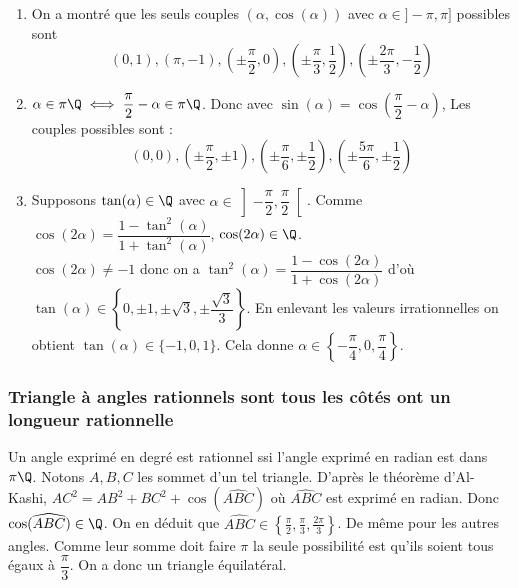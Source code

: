 \documentclass{book}
\begin{document}
\begin{enumerate}[leftmargin=*]
		Supposons que $q$ s'écrive $q=2m$ avec $m$ impair. Alors $2\alpha=\dfrac{p}{m}$ satisfait les hypothèse du cas de la question 2. Donc avec $\cos(2\alpha)=\cos(\alpha)^2-1$ on en déduit que les valeurs possibles pour $\cos(\alpha)$ sont $-1,1,0,\pm\dfrac{1}{2}$ et $\pm\dfrac{\sqrt{3}}{2}$. La seule compatible avec la forme de $\alpha$ est $0$ ce qui impose $q=2$, ici exclus.
		\item On a montré que les seuls couples $(\alpha,\cos(\alpha))$ avec $\alpha\in ]-\pi,\pi]$ possibles sont $$(0,1),(\pi,-1),\left(\pm\frac{\pi}{2},0\right),\left(\pm\frac{\pi}{3},\frac{1}{2}\right),\left(\pm\frac{2\pi}{3},-\frac{1}{2}\right)$$
		\item $\alpha\in \pi\Q\iff \dfrac{\pi}{2}-\alpha\in\pi\Q$. Donc avec $\sin(\alpha)=\cos\left(\dfrac{\pi}{2}-\alpha\right)$, Les couples possibles sont :
		$$(0,0),\left(\pm\frac{\pi}{2},\pm1\right),\left(\pm\frac{\pi}{6},\pm\frac{1}{2}\right),\left(\pm\frac{5\pi}{6},\pm\frac{1}{2}\right)$$
		\item Supposons $\tan(\alpha)\in \Q$ avec $\alpha\in \left]-\dfrac{\pi}{2},\dfrac{\pi}{2}\right[$. Comme $\cos(2\alpha)=\dfrac{1-\tan^2(\alpha)}{1+\tan^2(\alpha)}$, $\cos(2\alpha)\in \Q$.\\
		$\cos(2\alpha)\ne -1$ donc on a $\tan^2(\alpha)=\dfrac{1-\cos(2\alpha)}{1+\cos(2\alpha)}$ d'où $\tan(\alpha)\in \left\{0,\pm1,\pm\sqrt 3,\pm\dfrac{\sqrt 3}{3}\right\}$. En enlevant les valeurs irrationnelles on obtient $\tan(\alpha)\in\{-1,0,1\}$. Cela donne $\alpha\in \left\{-\dfrac{\pi}{4},0,\dfrac{\pi}{4}\right\}$.
	\end{enumerate}
	
	\subsubsection{Triangle à angles rationnels sont tous les côtés ont un longueur rationnelle }
	Un angle exprimé en degré est rationnel ssi l'angle exprimé en radian est dans $\pi\Q$. Notons $A,B,C$ les sommet d'un tel triangle. D'après le théorème d'Al-Kashi, $AC^2=AB^2+BC^2+\cos(\widehat{ABC})$ où $\widehat{ABC}$ est exprimé en radian. Donc $\cos(\widehat{ABC})\in \Q$. On en déduit que $\widehat{ABC}\in \displaystyle\left\{\frac{\pi}{2},\frac{\pi}{3},\frac{2\pi}{3}\right\}$. De même pour les autres angles. Comme leur somme doit faire $\pi$ la seule possibilité est qu'ils soient tous égaux à $\dfrac{\pi}{3}$. On a donc un triangle équilatéral.
	
\end{document}
